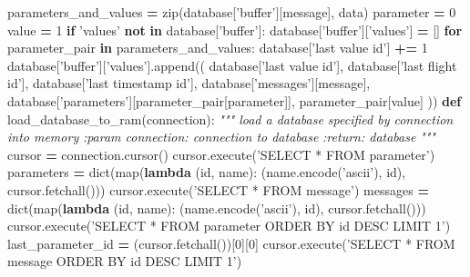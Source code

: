 \documentclass[12pt,oneside]{reedthesis}
\newenvironment{Shaded}{\begin{snugshade}}{\end{snugshade}}
\newcommand{\KeywordTok}[1]{\textcolor[rgb]{0.13,0.29,0.53}{\textbf{#1}}}
\newcommand{\DecValTok}[1]{\textcolor[rgb]{0.00,0.00,0.81}{#1}}
\newcommand{\StringTok}[1]{\textcolor[rgb]{0.31,0.60,0.02}{#1}}
\newcommand{\CommentTok}[1]{\textcolor[rgb]{0.56,0.35,0.01}{\textit{#1}}}
\newcommand{\ControlFlowTok}[1]{\textcolor[rgb]{0.13,0.29,0.53}{\textbf{#1}}}
\newcommand{\OperatorTok}[1]{\textcolor[rgb]{0.81,0.36,0.00}{\textbf{#1}}}
\newcommand{\BuiltInTok}[1]{#1}
\newcommand{\NormalTok}[1]{#1}
\theoremstyle{definition}
\theoremstyle{definition}
\theoremstyle{definition}
\theoremstyle{remark}
\begin{document}
\begin{Shaded}
\begin{Highlighting}[]
{{{{{\NormalTok{    parameters_and_values }\OperatorTok{=} \BuiltInTok{zip}\NormalTok{(database[}\StringTok{'buffer'}\NormalTok{][message], data)}
\NormalTok{    parameter }\OperatorTok{=} \DecValTok{0}
\NormalTok{    value }\OperatorTok{=} \DecValTok{1}
    \ControlFlowTok{if} \StringTok{'values'} \KeywordTok{not} \KeywordTok{in}\NormalTok{ database[}\StringTok{'buffer'}\NormalTok{]:}
\NormalTok{        database[}\StringTok{'buffer'}\NormalTok{][}\StringTok{'values'}\NormalTok{] }\OperatorTok{=}\NormalTok{ []}
    \ControlFlowTok{for}\NormalTok{ parameter_pair }\KeywordTok{in}\NormalTok{ parameters_and_values:}
\NormalTok{        database[}\StringTok{'last value id'}\NormalTok{] }\OperatorTok{+=} \DecValTok{1}
\NormalTok{        database[}\StringTok{'buffer'}\NormalTok{][}\StringTok{'values'}\NormalTok{].append((}
\NormalTok{            database[}\StringTok{'last value id'}\NormalTok{],}
\NormalTok{            database[}\StringTok{'last flight id'}\NormalTok{],}
\NormalTok{            database[}\StringTok{'last timestamp id'}\NormalTok{],}
\NormalTok{            database[}\StringTok{'messages'}\NormalTok{][message],}
\NormalTok{            database[}\StringTok{'parameters'}\NormalTok{][parameter_pair[parameter]],}
\NormalTok{            parameter_pair[value]}
\NormalTok{        ))}
\KeywordTok{def}\NormalTok{ load_database_to_ram(connection):    }
    \CommentTok{""" load a database specified by connection into memory}
\CommentTok{    :param connection: connection to database}
\CommentTok{    :return: database}
\CommentTok{    """}
\NormalTok{    cursor }\OperatorTok{=}\NormalTok{ connection.cursor()}
\NormalTok{    cursor.execute(}\StringTok{'SELECT * FROM parameter'}\NormalTok{)}
\NormalTok{    parameters }\OperatorTok{=} \BuiltInTok{dict}\NormalTok{(}\BuiltInTok{map}\NormalTok{(}\KeywordTok{lambda}\NormalTok{ (}\BuiltInTok{id}\NormalTok{, name): (name.encode(}\StringTok{'ascii'}\NormalTok{), }
      \BuiltInTok{id}\NormalTok{), cursor.fetchall()))}
\NormalTok{    cursor.execute(}\StringTok{'SELECT * FROM message'}\NormalTok{)}
\NormalTok{    messages }\OperatorTok{=} \BuiltInTok{dict}\NormalTok{(}\BuiltInTok{map}\NormalTok{(}\KeywordTok{lambda}\NormalTok{ (}\BuiltInTok{id}\NormalTok{, name): (name.encode(}\StringTok{'ascii'}\NormalTok{), }
      \BuiltInTok{id}\NormalTok{), cursor.fetchall()))}
\NormalTok{    cursor.execute(}\StringTok{'SELECT * FROM parameter ORDER BY id DESC LIMIT 1'}\NormalTok{)}
\NormalTok{    last_parameter_id }\OperatorTok{=}\NormalTok{ (cursor.fetchall())[}\DecValTok{0}\NormalTok{][}\DecValTok{0}\NormalTok{]}
\NormalTok{    cursor.execute(}\StringTok{'SELECT * FROM message ORDER BY id DESC LIMIT 1'}\NormalTok{)}
}}}}}
\end{Highlighting}
\end{Shaded}
\end{document}

